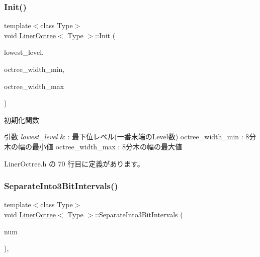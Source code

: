 \subsubsection{\texorpdfstring{Init()}{Init()}}
{\footnotesize\ttfamily template$<$class Type$>$ \\
void \mbox{\hyperlink{class_liner_octree}{Liner\+Octree}}$<$ Type $>$\+::Init (\begin{DoxyParamCaption}\item[{unsigned}]{lowest\+\_\+level,  }\item[{\mbox{\hyperlink{_vector3_d_8h_ab16f59e4393f29a01ec8b9bbbabbe65d}{Vec3}}}]{octree\+\_\+width\+\_\+min,  }\item[{\mbox{\hyperlink{_vector3_d_8h_ab16f59e4393f29a01ec8b9bbbabbe65d}{Vec3}}}]{octree\+\_\+width\+\_\+max }\end{DoxyParamCaption})\hspace{0.3cm}{\ttfamily [inline]}}



初期化関数 


\begin{DoxyParams}{引数}
{\em lowest\+\_\+level} & \+: 最下位レベル(一番末端の\+Level数) octree\+\_\+width\+\_\+min \+: 8分木の幅の最小値 octree\+\_\+width\+\_\+max \+: 8分木の幅の最大値 \\
\hline
\end{DoxyParams}


 Liner\+Octree.\+h の 70 行目に定義があります。

\mbox{\label{class_liner_octree_acfa567ec0f969684f55443fc9ee98432}} 
\subsubsection{\texorpdfstring{Separate\+Into3\+Bit\+Intervals()}{SeparateInto3BitIntervals()}}
{\footnotesize\ttfamily template$<$class Type$>$ \\
void \mbox{\hyperlink{class_liner_octree}{Liner\+Octree}}$<$ Type $>$\+::Separate\+Into3\+Bit\+Intervals (\begin{DoxyParamCaption}\item[{D\+W\+O\+RD $\ast$}]{num }\end{DoxyParamCaption})\hspace{0.3cm}{\ttfamily [inline]}, {\ttfamily [private]}}



